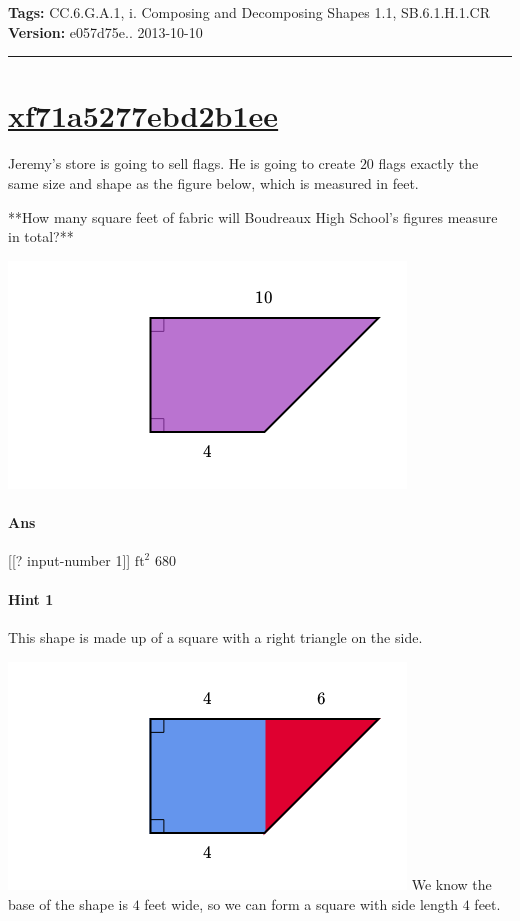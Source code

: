 \documentclass[twocolumn,10pt]{article}
\def\shrinkfactor{0.55}
\begin{document}
\medskip
\noindent
\textbf{Tags:} {\footnotesize CC.6.G.A.1, i.	Composing and Decomposing Shapes 1.1, SB.6.1.H.1.CR}\\
\textbf{Version:} e057d75e.. 2013-10-10
\smallskip\hrule





\section{\href{https://www.khanacademy.org/devadmin/content/items/xf71a5277ebd2b1ee}{xf71a5277ebd2b1ee}}

\noindent
Jeremy's store is going to sell flags.  He is going to create $20$ flags exactly the same size and shape as the figure below, which is measured in feet.  

**How many square feet of fabric will Boudreaux High School's figures measure in total?**  


\includegraphics[scale=\shrinkfactor]{figures/c8cf929bc48769662f632249ba27b280583022be.png}

\paragraph{Ans}  [[? input-number 1]] $\text{ft}^2$  680

\paragraph{Hint 1}This shape is made up of a square with a right triangle on the side.   

\includegraphics[scale=\shrinkfactor]{figures/0a0b9a190445c19aeb3387bb4fe82ab760c99ff7.png}         
We know the base of the shape is $4$ feet wide, so we can form a square with side length $4$ feet.
\end{document}
